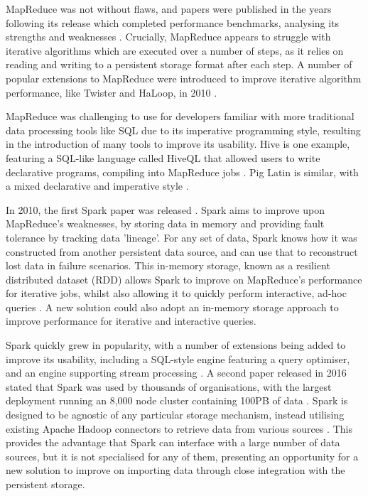 MapReduce was not without flaws, and papers were published in the years following its release which completed performance benchmarks, analysing its strengths and weaknesses \cite{lee2012parallel}. Crucially, MapReduce appears to struggle with iterative algorithms which are executed over a number of steps, as it relies on reading and writing to a persistent storage format after each step. A number of popular extensions to MapReduce were introduced to improve iterative algorithm performance, like Twister and HaLoop, in 2010 \cite{ekanayake2010twister, bu2010haloop}.

MapReduce was challenging to use for developers familiar with more traditional data processing tools like SQL due to its imperative programming style, resulting in the introduction of many tools to improve its usability. Hive is one example, featuring a SQL-like language called HiveQL that allowed users to write declarative programs, compiling into MapReduce jobs \cite{thusoo2010hive}. Pig Latin is similar, with a mixed declarative and imperative  style \cite{olston2008pig}. 

In 2010, the first Spark paper was released \cite{zaharia2010spark}. Spark aims to improve upon MapReduce's weaknesses, by storing data in memory and providing fault tolerance by tracking data 'lineage'. For any set of data, Spark knows how it was constructed from another persistent data source, and can use that to reconstruct lost data in failure scenarios. This in-memory storage, known as a resilient distributed dataset (RDD) allows Spark to improve on MapReduce's performance for iterative jobs, whilst also allowing it to quickly perform interactive, ad-hoc queries \cite{zaharia2012rdd}. A new solution could also adopt an in-memory storage approach to improve performance for iterative and interactive queries.

Spark quickly grew in popularity, with a number of extensions being added to improve its usability, including a SQL-style engine featuring a query optimiser, and an engine supporting stream processing \cite{armbrust2015sparksql, armbrust2018sparkstreaming}. A second paper released in 2016 stated that Spark was used by thousands of organisations, with the largest deployment running an 8,000 node cluster containing 100PB of data \cite{zaharia2016spark}. Spark is designed to be agnostic of any particular storage mechanism, instead utilising existing Apache Hadoop connectors to retrieve data from various sources \cite{rddprogrammingguide}. This provides the advantage that Spark can interface with a large number of data sources, but it is not specialised for any of them, presenting an opportunity for a new solution to improve on importing data through close integration with the persistent storage.

